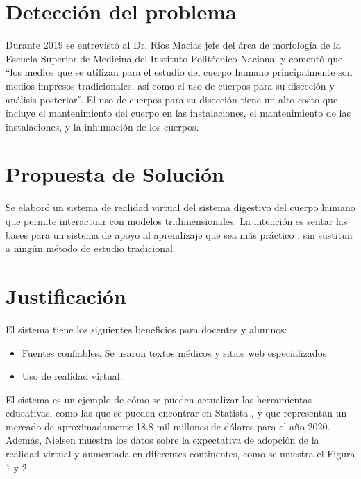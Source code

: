 \newpage

\section{Detecci\'on del problema} 

Durante 2019 se entrevistó al Dr. Rios Macias jefe del área de morfología de la Escuela Superior de Medicina del Instituto Politécnico Nacional y comentó que “los medios que se utilizan para el estudio del cuerpo humano principalmente son medios impresos tradicionales, así como el uso de cuerpos para su disección y análisis posterior”. El uso de cuerpos para su disección tiene un alto costo que incluye el mantenimiento del cuerpo en las instalaciones, el mantenimiento de las instalaciones, y la inhumación de los cuerpos.
\\
\newline
\section{Propuesta de Solución}

Se elaboró un sistema de realidad virtual del sistema digestivo del cuerpo humano que permite interactuar con modelos tridimensionales. La intención es sentar las bases para un sistema de apoyo al aprendizaje que sea más práctico \cite{moore1995learning}, sin sustituir a ningún método de estudio tradicional.
\\
\newline
\section{Justificación}
\label{just}

El sistema tiene los siguientes beneficios para docentes y alumnos: 
\begin{itemize}
\item Fuentes confiables. Se usaron textos médicos y sitios web especializados
\item Uso de realidad virtual\cite{norton1994integrating}.
\end{itemize}

El sistema es un ejemplo de cómo se pueden actualizar las herramientas educativas, como las que se pueden encontrar en Statista \cite{web1}, y que representan un mercado de aproximadamente 18.8 mil millones de dólares para el año 2020. Además, Nielsen\cite{web2} muestra los datos sobre la expectativa de adopción de la realidad virtual y aumentada en diferentes continentes, como se muestra el Figura 1 y 2.

